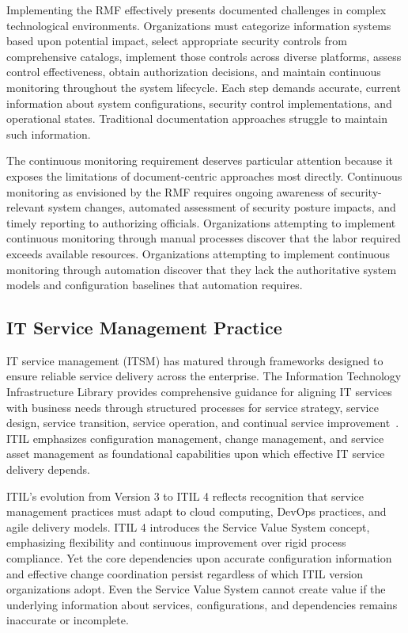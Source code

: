 Implementing the RMF effectively presents documented challenges in complex technological environments. Organizations must categorize information systems based upon potential impact, select appropriate security controls from comprehensive catalogs, implement those controls across diverse platforms, assess control effectiveness, obtain authorization decisions, and maintain continuous monitoring throughout the system lifecycle. Each step demands accurate, current information about system configurations, security control implementations, and operational states. Traditional documentation approaches struggle to maintain such information.

The continuous monitoring requirement deserves particular attention because it exposes the limitations of document-centric approaches most directly. Continuous monitoring as envisioned by the RMF requires ongoing awareness of security-relevant system changes, automated assessment of security posture impacts, and timely reporting to authorizing officials. Organizations attempting to implement continuous monitoring through manual processes discover that the labor required exceeds available resources. Organizations attempting to implement continuous monitoring through automation discover that they lack the authoritative system models and configuration baselines that automation requires.

\subsection{IT Service Management Practice}

IT service management (ITSM) has matured through frameworks designed to ensure reliable service delivery across the enterprise. The Information Technology Infrastructure Library provides comprehensive guidance for aligning IT services with business needs through structured processes for service strategy, service design, service transition, service operation, and continual service improvement~\parencite{Cannon_AXELOS_2013}. ITIL emphasizes configuration management, change management, and service asset management as foundational capabilities upon which effective IT service delivery depends.

ITIL's evolution from Version 3 to ITIL 4 reflects recognition that service management practices must adapt to cloud computing, DevOps practices, and agile delivery models. ITIL 4 introduces the Service Value System concept, emphasizing flexibility and continuous improvement over rigid process compliance. Yet the core dependencies upon accurate configuration information and effective change coordination persist regardless of which ITIL version organizations adopt. Even the Service Value System cannot create value if the underlying information about services, configurations, and dependencies remains inaccurate or incomplete.

